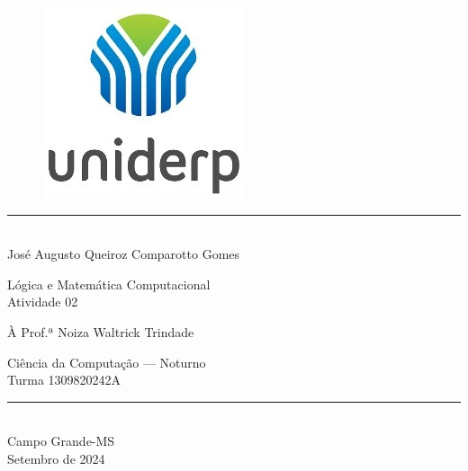 \documentclass[12pt, a4paper, onecolumn]{exam}
\author{\authorfullname}
\title{\subject: \assignment}
\newcommand{\subject}{Lógica e Matemática Computacional}
\newcommand{\assignment}{Atividade 02}
\newcommand{\authorfullname}{José Augusto Queiroz Comparotto Gomes}
\newcommand{\professor}{Prof.ª Noiza Waltrick Trindade}
\newcommand{\course}{Ciência da Computação — Noturno}
\newcommand{\classno}{1309820242A}
\newcommand{\location}{Campo Grande-MS}
\newcommand{\documentdate}{Setembro de 2024}
\begin{document}
\begingroup  

    \centering
    \begin{figure}
        \centering
        \includegraphics[width=0.15\linewidth]{./assets/uniderp.jpg}
        \label{fig:university-logo}
    \end{figure}
    
    \rule{\textwidth}{2pt}  \\[1em]
    
    \LARGE \authorfullname

    \vfill
    
    \LARGE \subject     \\
    \LARGE \assignment
    
    \vfill
    
    \large À \professor \\

    \vfill
    
    \large \course          \\
    \large Turma \classno   \\[1em]
    
    \rule{\textwidth}{2pt}  \\[1em]

    \large \location        \\
    \large \documentdate    \\

    \pagebreak
\endgroup

\pointsdroppedatright   %
\printanswers
\renewcommand{\solutiontitle}{\noindent\textbf{Resposta:}\enspace}  
\end{document}
